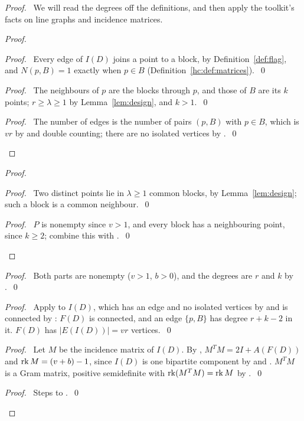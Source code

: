\begin{proof}
 \pfsketch\ We will read the degrees off the definitions, and then apply the toolkit's facts on
 line graphs and incidence matrices.
 \begin{proof}
  \begin{proof}\pf\ Every edge of $I(D)$ joins a point to a block, by Definition~\ref{def:flag},
   and $N(p,B)=1$ exactly when $p\in B$ (Definition~\ref{hc:def:matrices}).~\qed\end{proof}
  \begin{proof}\pf\ The neighbours of $p$ are the blocks through $p$, and those of $B$ are its
   $k$ points; $r\ge\lambda\ge1$ by Lemma~\ref{lem:design}, and $k>1$.~\qed\end{proof}
  \qedstep
  \begin{proof}\pf\ The number of edges is the number of pairs $(p,B)$ with $p\in B$, which is
   $vr$ by  and double counting; there are no isolated vertices by
   .~\qed\end{proof}
 \end{proof}
 \begin{proof}
  \begin{proof}\pf\ Two distinct points lie in $\lambda\ge1$ common blocks, by
   Lemma~\ref{lem:design}; such a block is a common neighbour.~\qed\end{proof}
  \qedstep
  \begin{proof}\pf\ $P$ is nonempty since $v>1$, and every block has a neighbouring point, since
   $k\ge2$; combine this with .~\qed\end{proof}
 \end{proof}
 \begin{proof}\pf\ Both parts are nonempty ($v>1$, $b>0$), and the degrees are $r$ and $k$ by
  .~\qed\end{proof}
 \begin{proof}\pf\ Apply  to $I(D)$, which has an edge and no isolated vertices
  by  and is connected by : $F(D)$ is connected, and an edge
  $\{p,B\}$ has degree $r+k-2$ in it. $F(D)$ has $|E(I(D))|=vr$ vertices.~\qed\end{proof}
 \begin{proof}\pf\ Let $M$ be the incidence matrix of $I(D)$. By ,
  $M^TM=2I+A(F(D))$ and $\mathop{\mathrm{rk}}\nolimits M=(v+b)-1$, since $I(D)$ is one bipartite component by
   and . $M^TM$ is a Gram matrix, positive semidefinite
  with $\mathop{\mathrm{rk}}\nolimits(M^TM)=\mathop{\mathrm{rk}}\nolimits M$ by .~\qed\end{proof}
 \qedstep
 \begin{proof}\pf\ Steps  to .~\qed\end{proof}
\end{proof}

